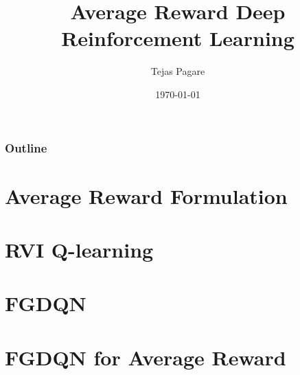 \documentclass{beamer}
\title[EE 691 RnD Project]{Average Reward Deep Reinforcement Learning} %
\author{Tejas Pagare} %
\institute[IIT Bombay] %
{
 \textit{advised by} \\%
\medskip
{Prof. Vivek Borkar}\\

{Electrical Engineering Dept.}\\
{IIT Bombay}
}
\date{\today} %
\begin{document}
\begin{frame}
\titlepage %
\end{frame}

\begin{frame}
\frametitle{Outline} %
\tableofcontents %
\end{frame}


\section{Average Reward Formulation} %

\section{RVI Q-learning}

\section{FGDQN}

\section{FGDQN for Average Reward}
\end{document}
